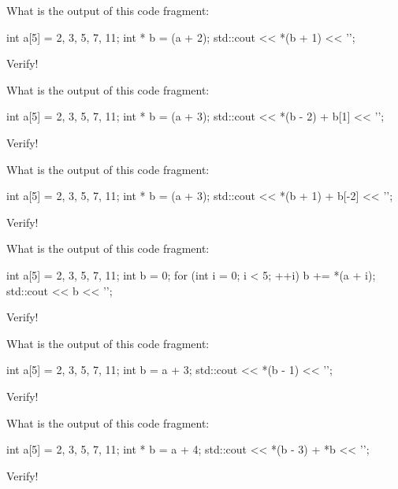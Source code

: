\begin{ex}
What is the output of this code fragment:

\begin{consolethree}[escapeinside=||]
int a[5] = {2, 3, 5, 7, 11};
int * b = (a + 2);
std::cout << *(b + 1) << '\n';
\end{consolethree}

Verify!
\end{ex}

\begin{ex}
What is the output of this code fragment:

\begin{consolethree}[escapeinside=||]
int a[5] = {2, 3, 5, 7, 11};
int * b = (a + 3);
std::cout << *(b - 2) + b[1] << '\n';
\end{consolethree}

Verify!
\end{ex}

\begin{ex}
What is the output of this code fragment:

\begin{consolethree}[escapeinside=||]
int a[5] = {2, 3, 5, 7, 11};
int * b = (a + 3);
std::cout << *(b + 1) + b[-2] << '\n';
\end{consolethree}

Verify!
\end{ex}

\begin{ex}
What is the output of this code fragment:

\begin{consolethree}[escapeinside=||]
int a[5] = {2, 3, 5, 7, 11};
int b = 0;
for (int i = 0; i < 5; ++i)
{
    b += *(a + i);
}
std::cout << b << '\n';
\end{consolethree}

Verify!
\end{ex}

\begin{ex}
What is the output of this code fragment:

\begin{consolethree}[escapeinside=||]
int a[5] = {2, 3, 5, 7, 11};
int b = a + 3;
std::cout << *(b - 1) << '\n';
\end{consolethree}

Verify!
\end{ex}

\begin{ex}
What is the output of this code fragment:

\begin{consolethree}[escapeinside=||]
int a[5] = {2, 3, 5, 7, 11};
int * b = a + 4;
std::cout << *(b - 3) + *b << '\n';
\end{consolethree}

Verify!
\end{ex}

